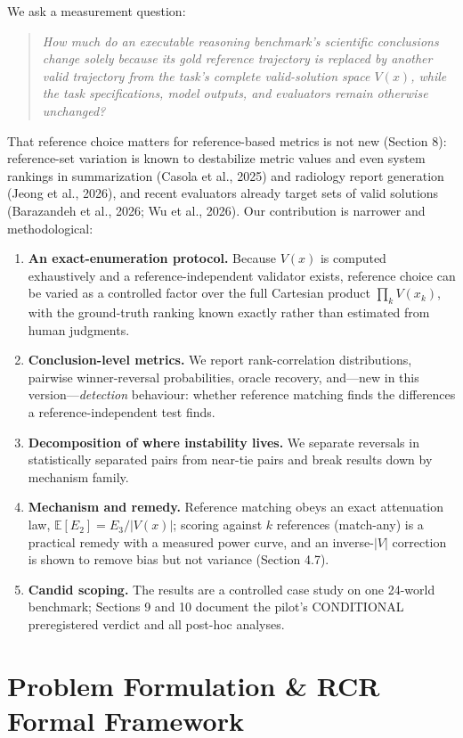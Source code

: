 \documentclass[11pt]{article}
\begin{document}
We ask a measurement question:

\begin{quote}
\emph{How much do an executable reasoning benchmark's scientific conclusions change solely because its gold reference trajectory is replaced by another valid trajectory from the task's complete valid-solution space $V(x)$, while the task specifications, model outputs, and evaluators remain otherwise unchanged?}
\end{quote}
That reference choice matters for reference-based metrics is not new (Section 8): reference-set variation is known to destabilize metric values and even system rankings in summarization (Casola et al., 2025) and radiology report generation (Jeong et al., 2026), and recent evaluators already target sets of valid solutions (Barazandeh et al., 2026; Wu et al., 2026). Our contribution is narrower and methodological:

\begin{enumerate}
\item \textbf{An exact-enumeration protocol.} Because $V(x)$ is computed exhaustively and a reference-independent validator exists, reference choice can be varied as a controlled factor over the full Cartesian product $\prod_k V(x_k)$, with the ground-truth ranking known exactly rather than estimated from human judgments.
\item \textbf{Conclusion-level metrics.} We report rank-correlation distributions, pairwise winner-reversal probabilities, oracle recovery, and---new in this version---\emph{detection} behaviour: whether reference matching finds the differences a reference-independent test finds.
\item \textbf{Decomposition of where instability lives.} We separate reversals in statistically separated pairs from near-tie pairs and break results down by mechanism family.
\item \textbf{Mechanism and remedy.} Reference matching obeys an exact attenuation law, $\mathbb{E}[E_2] = E_3/|V(x)|$; scoring against $k$ references (match-any) is a practical remedy with a measured power curve, and an inverse-$|V|$ correction is shown to remove bias but not variance (Section 4.7).
\item \textbf{Candid scoping.} The results are a controlled case study on one 24-world benchmark; Sections 9 and 10 document the pilot's CONDITIONAL preregistered verdict and all post-hoc analyses.
\end{enumerate}
\section{Problem Formulation \& RCR Formal Framework}
\end{document}
